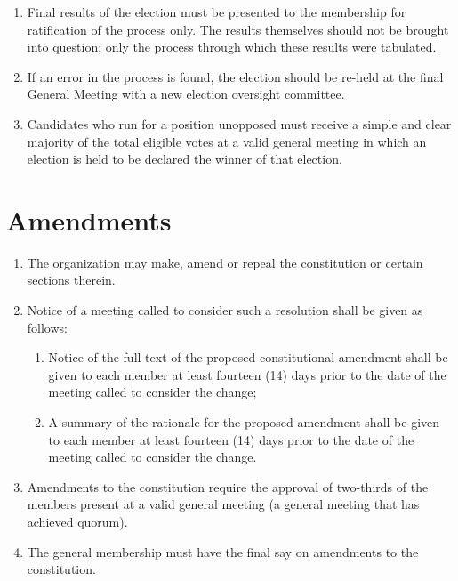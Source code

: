 \documentclass[12pt]{article}
\begin{document}
\begin{enumerate}[{10}.1]
    \item Final results of the election must be presented to the membership for ratification of the process only. The results themselves should not be brought into question; only the process through which these results were tabulated. 
    \item If an error in the process is found, the election should be re-held at the final General Meeting with a new election oversight committee.
    \item Candidates who run for a position unopposed must receive a simple and clear majority of the total eligible votes at a valid general meeting in which an election is held to be declared the winner of that election. 
\end{enumerate}


\section{Amendments}
\begin{enumerate}[{11}.1]
    \item The organization may make, amend or repeal the constitution or certain sections therein. 
    \item Notice of a meeting called to consider such a resolution shall be given as follows: 
        \begin{enumerate}[{11.2}.1]
            \item Notice of the full text of the proposed constitutional amendment shall be given to each member at least fourteen (14) days prior to the date of the meeting called to consider the change; 
            \item A summary of the rationale for the proposed amendment shall be given to each member at least fourteen (14) days prior to the date of the meeting called to consider the change.
        \end{enumerate}
    \item Amendments to the constitution require the approval of two-thirds of the members present at a valid general meeting (a general meeting that has achieved quorum).
    \item The general membership must have the final say on amendments to the constitution.  
\end{enumerate}


\end{document}

